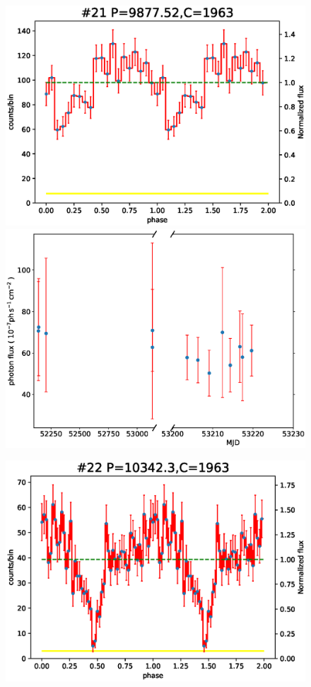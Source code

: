 \documentclass[fleqn,usenatbib]{mnras}
\begin{document}
\begin{figure}
\begin{minipage}[t]{0.45\textwidth}
\includegraphics[width=\textwidth]{./figure/LW/pfold_lc_153001.eps}
\includegraphics[width=\textwidth]{./figure/LW/153001_lc.eps}
\end{minipage}
\begin{minipage}[t]{0.45\textwidth}
\includegraphics[width=\textwidth]{./figure/LW/pfold_lc_153002.eps}

\end{minipage}
\end{figure}
\end{document}
